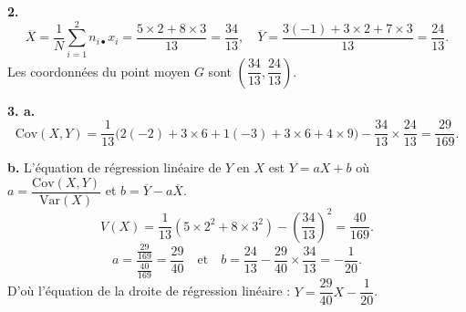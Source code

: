 \documentclass[11pt]{article}
\begin{document}
\textbf{2.}
\[ \overline{X} = \frac{1}{N}\sum_{i=1}^2 n_{i\bullet}x_i = \frac{5 \times 2 + 8 \times 3}{13} = \frac{34}{13}, \quad \overline{Y} = \frac{3(-1) + 3 \times 2 + 7 \times 3}{13} = \frac{24}{13}. \]
Les coordonnées du point moyen $G$ sont $\left(\dfrac{34}{13}, \dfrac{24}{13}\right)$.

\textbf{3. a.}
\[ \mathrm{Cov}(X, Y) = \frac{1}{13}\big(2(-2) + 3 \times 6 + 1(-3) + 3 \times 6 + 4 \times 9\big) - \frac{34}{13} \times \frac{24}{13} = \frac{29}{169}. \]

\textbf{b.} L'équation de régression linéaire de $Y$ en $X$ est $Y = aX + b$ où $a = \dfrac{\mathrm{Cov}(X, Y)}{\mathrm{Var}(X)}$ et $b = \overline{Y} - a\overline{X}$.
\[ V(X) = \frac{1}{13}(5 \times 2^2 + 8 \times 3^2) - \left(\frac{34}{13}\right)^2 = \frac{40}{169}. \]
\[ a = \frac{\frac{29}{169}}{\frac{40}{169}} = \frac{29}{40} \quad \text{et} \quad b = \frac{24}{13} - \frac{29}{40} \times \frac{34}{13} = -\frac{1}{20}. \]
D'où l'équation de la droite de régression linéaire : $Y = \dfrac{29}{40}X - \dfrac{1}{20}$.
\end{document}
